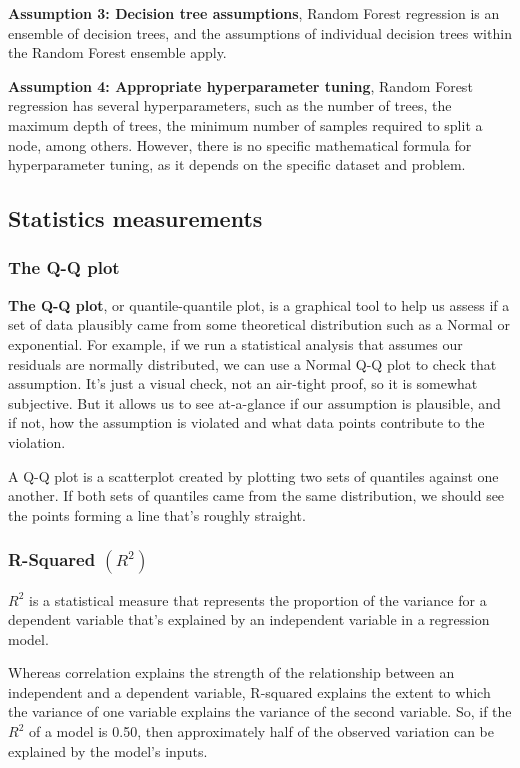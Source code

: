\textbf{Assumption 3: Decision tree assumptions}, Random Forest regression is an ensemble of decision trees, and the assumptions of individual decision trees within the Random Forest ensemble apply.

\textbf{Assumption 4: Appropriate hyperparameter tuning}, Random Forest regression has several hyperparameters, such as the number of trees, the maximum depth of trees, the minimum number of samples required to split a node, among others. However, there is no specific mathematical formula for hyperparameter tuning, as it depends on the specific dataset and problem.

\subsection{Statistics measurements}
\subsubsection{The Q-Q plot}
\noindent 

\textbf{The Q-Q plot}, or quantile-quantile plot, is a graphical tool to help us assess if a set of data plausibly came from some theoretical distribution such as a Normal or exponential. For example, if we run a statistical analysis that assumes our residuals are normally distributed, we can use a Normal Q-Q plot to check that assumption. It’s just a visual check, not an air-tight proof, so it is somewhat subjective. But it allows us to see at-a-glance if our assumption is plausible, and if not, how the assumption is violated and what data points contribute to the violation.

A Q-Q plot is a scatterplot created by plotting two sets of quantiles against one another. If both sets of quantiles came from the same distribution, we should see the points forming a line that’s roughly straight.
\subsubsection{R-Squared $(R^{2})$}
\noindent 

$R^2$ is a statistical measure that represents the proportion of the variance for a dependent variable that’s explained by an independent variable in a regression model.

Whereas correlation explains the strength of the relationship between an independent and a dependent variable, R-squared explains the extent to which the variance of one variable explains the variance of the second variable. So, if the $R^{2}$ of a model is 0.50, then approximately half of the observed variation can be explained by the model’s inputs.

